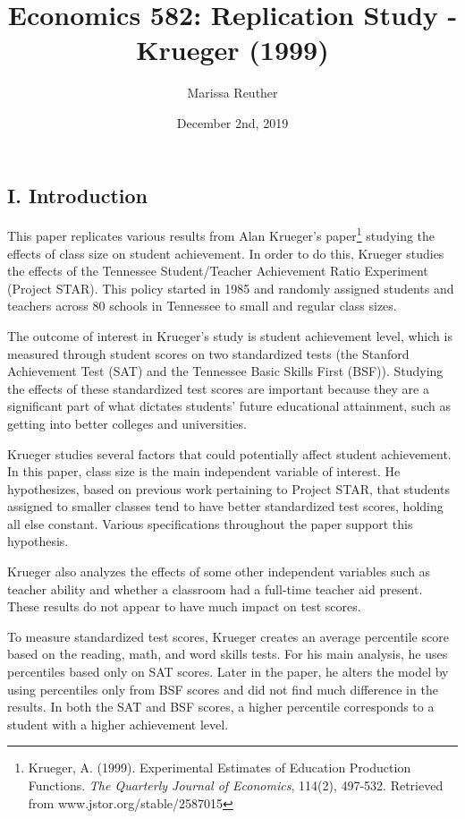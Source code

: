 \documentclass[a4paper,11pt]{article}
\begin{document}
\title{Economics 582: Replication Study - Krueger (1999)}
\author{Marissa Reuther}
\date{December 2nd, 2019}
\maketitle

\subsection*{I. Introduction}
This paper replicates various results from Alan Krueger's paper\footnote{Krueger, A. (1999). Experimental Estimates of Education Production Functions. \textit{The Quarterly Journal of Economics}, 114(2), 497-532. Retrieved from www.jstor.org/stable/2587015}  studying the effects of class size on student achievement. In order to do this, Krueger studies the effects of the Tennessee Student/Teacher Achievement Ratio Experiment (Project STAR). This policy started in 1985 and randomly assigned students and teachers across 80 schools in Tennessee to small and regular class sizes. \par

The outcome of interest in Krueger’s study is student achievement level, which is  measured through student scores on two standardized tests (the Stanford Achievement
Test (SAT) and the Tennessee Basic Skills First (BSF)). Studying the effects of these standardized test scores are important because they are a significant part of what dictates students’ future educational attainment, such as getting into better colleges and universities.  \par

Krueger studies several factors that could potentially affect student achievement. In this paper, class size is the main independent variable of interest. He hypothesizes, based on previous work pertaining to Project STAR, that students assigned to smaller classes tend to have better standardized test scores, holding all else constant. Various specifications throughout the paper support this hypothesis. \par

Krueger also analyzes the effects of some other independent variables such as teacher ability and whether a classroom had a full-time teacher aid present. These results do not appear to have much impact on test scores. \par

To measure standardized test scores, Krueger creates an average percentile score based on the reading, math, and word skills tests. For his main analysis, he uses percentiles based only on SAT scores. Later in the paper, he alters the model by using percentiles only from BSF scores and did not find much difference in the results. In both the SAT and BSF scores, a higher percentile corresponds to a student with a higher achievement level. \par
\end{document}

